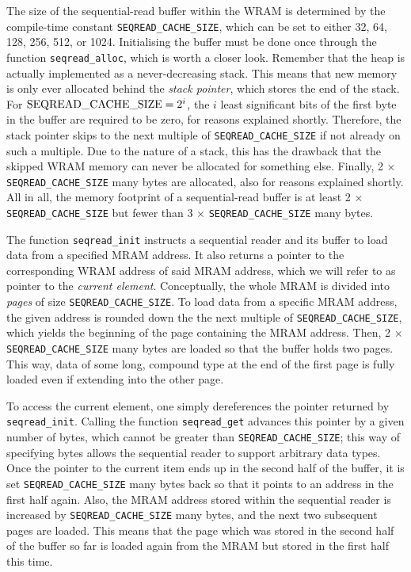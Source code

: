 The size of the sequential-read buffer within the WRAM is determined by the compile-time constant \lstinline|SEQREAD_CACHE_SIZE|, which can be set to either 32, 64, 128, 256, 512, or 1024.
Initialising the buffer must be done once through the function \lstinline|seqread_alloc|, which is worth a closer look.
Remember that the heap is actually implemented as a never-decreasing stack.
This means that new memory is only ever allocated behind the \emph{stack pointer}, which stores the end of the stack.
For \(\text{\lstinline|SEQREAD_CACHE_SIZE|} = 2^i\), the \(i\) least significant bits of the first byte in the buffer are required to be zero, for reasons explained shortly.
Therefore, the stack pointer skips to the next multiple of \lstinline|SEQREAD_CACHE_SIZE| if not already on such a multiple.
Due to the nature of a stack, this has the drawback that the skipped WRAM memory can never be allocated for something else.
Finally, 2 × \lstinline|SEQREAD_CACHE_SIZE| many bytes are allocated, also for reasons explained shortly.
All in all, the memory footprint of a sequential-read buffer is at least 2 × \lstinline|SEQREAD_CACHE_SIZE| but fewer than 3 × \lstinline|SEQREAD_CACHE_SIZE| many bytes.

The function \lstinline|seqread_init| instructs a sequential reader and its buffer to load data from a specified MRAM address.
It also returns a pointer to the corresponding WRAM address of said MRAM address, which we will refer to as pointer to the \emph{current element}.
Conceptually, the whole MRAM is divided into \emph{pages} of size \lstinline|SEQREAD_CACHE_SIZE|.
To load data from a specific MRAM address, the given address is rounded down the the next multiple of \lstinline|SEQREAD_CACHE_SIZE|, which yields the beginning of the page containing the MRAM address.
Then, 2 × \lstinline|SEQREAD_CACHE_SIZE| many bytes are loaded so that the buffer holds two pages.
This way, data of some long, compound type at the end of the first page is fully loaded even if extending into the other page.

To access the current element, one simply dereferences the pointer returned by \lstinline|seqread_init|.
Calling the function \lstinline|seqread_get| advances this pointer by a given number of bytes, which cannot be greater than \lstinline|SEQREAD_CACHE_SIZE|;
this way of specifying bytes allows the sequential reader to support arbitrary data types.
Once the pointer to the current item ends up in the second half of the buffer, it is set \lstinline|SEQREAD_CACHE_SIZE| many bytes back so that it points to an address in the first half again.
Also, the MRAM address stored within the sequential reader is increased by \lstinline|SEQREAD_CACHE_SIZE| many bytes, and the next two subsequent pages are loaded.
This means that the page which was stored in the second half of the buffer so far is loaded again from the MRAM but stored in the first half this time.

